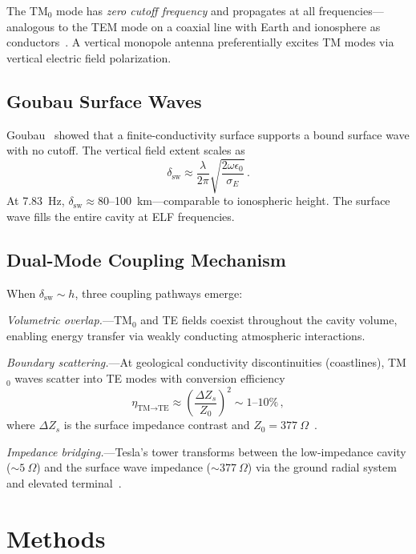 \documentclass[12pt,preprint,amsmath,amssymb]{revtex4-2}
\begin{document}
The TM$_0$ mode has \emph{zero cutoff frequency} and propagates at all frequencies---analogous to the
TEM mode on a coaxial line with Earth and ionosphere as conductors~\cite{wait1962}. A vertical monopole
antenna preferentially excites TM modes via vertical electric field polarization.

\subsection{Goubau Surface Waves}

Goubau~\cite{goubau1950} showed that a finite-conductivity surface supports a bound surface wave with
no cutoff. The vertical field extent scales as
\begin{equation}
  \delta_{\text{sw}} \approx \frac{\lambda}{2\pi}
    \sqrt{\frac{2\omega\epsilon_0}{\sigma_E}}\,.
  \label{eq:extent}
\end{equation}
At 7.83~Hz, $\delta_{\text{sw}} \approx 80$--100~km---comparable to ionospheric height. The surface
wave fills the entire cavity at ELF frequencies.

\subsection{Dual-Mode Coupling Mechanism}

When $\delta_{\text{sw}} \sim h$, three coupling pathways emerge:

\emph{Volumetric overlap.}---TM$_0$ and TE fields coexist throughout the cavity volume, enabling
energy transfer via weakly conducting atmospheric interactions.

\emph{Boundary scattering.}---At geological conductivity discontinuities (coastlines), TM$_0$ waves
scatter into TE modes with conversion efficiency
\begin{equation}
  \eta_{\text{TM}\to\text{TE}} \approx
    \left(\frac{\Delta Z_s}{Z_0}\right)^{\!2} \sim 1\text{--}10\%\,,
  \label{eq:conversion}
\end{equation}
where $\Delta Z_s$ is the surface impedance contrast and $Z_0 = 377~\Omega$~\cite{wait1962}.

\emph{Impedance bridging.}---Tesla's tower transforms between the low-impedance cavity (${\sim}5~\Omega$) and
the surface wave impedance (${\sim}377~\Omega$) via the ground radial system and elevated
terminal~\cite{corum2001}.

\section{Methods}
\label{sec:methods}
\end{document}
